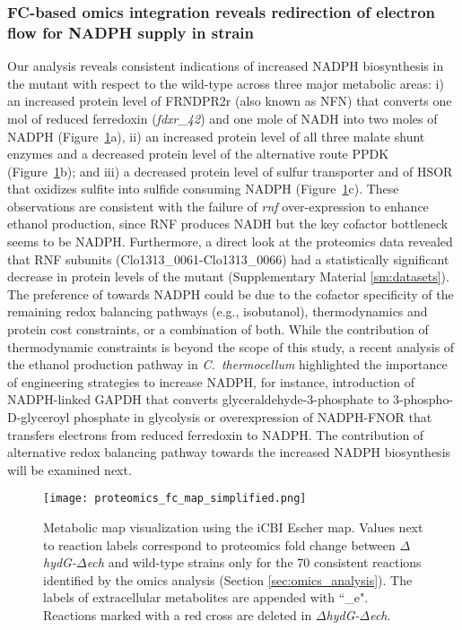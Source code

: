 \subsubsection{FC-based omics integration reveals redirection of electron flow for NADPH supply in \protect{} strain}
Our analysis reveals consistent indications of increased NADPH biosynthesis in the  mutant with respect to the wild-type across three major metabolic areas: i) an increased protein level of FRNDPR2r (also known as NFN) that converts one mol of reduced ferredoxin (\textit{fdxr\_42}) and one mole of NADH into two moles of NADPH
(Figure~\ref{fig6:map}a),
ii) an increased protein level of all three malate shunt enzymes and a decreased protein level of the alternative route PPDK (Figure~\ref{fig6:map}b);
and iii) a decreased protein level of sulfur transporter and of HSOR that oxidizes sulfite into sulfide consuming NADPH (Figure~\ref{fig6:map}c).
These observations are consistent with the failure of \textit{rnf} over-expression to enhance ethanol production,\citep{lo2017} since RNF produces NADH but the key cofactor bottleneck seems to be NADPH. Furthermore, a direct look at the proteomics data revealed that RNF subunits (Clo1313\_0061-Clo1313\_0066) had a statistically significant decrease in protein levels of the mutant (Supplementary Material \ref{sm:datasets}).
The preference of  towards NADPH could be due to the cofactor specificity of the remaining redox balancing pathways (e.g., isobutanol), thermodynamics and protein cost constraints, or a combination of both. While the contribution of thermodynamic constraints is beyond the scope of this study, a recent
analysis \citep{dash2019} of the ethanol production pathway in \textit{C.~thermocellum} highlighted the importance of engineering strategies to increase NADPH, for instance, introduction of NADPH-linked GAPDH that converts glyceraldehyde-3-phosphate to 3-phospho-D-glyceroyl phosphate in glycolysis or overexpression of NADPH-FNOR that transfers electrons from reduced ferredoxin to NADPH.
The contribution of alternative redox balancing pathway towards the increased NADPH biosynthesis will be examined next.


\begin{figure}[p]
    \centering
    \texttt{[image: proteomics\_fc\_map\_simplified.png]}
    \caption[Metabolic map visualization of proteomics data]{
        Metabolic map visualization using the iCBI Escher map. Values next to reaction labels correspond to proteomics fold change between \textit{$\Delta$hydG-$\Delta$ech} and wild-type strains only for the 70 consistent reactions identified by the omics analysis (Section \ref{sec:omics_analysis}).
    The labels of extracellular metabolites are appended with ``\_e".
    Reactions marked with a red cross are deleted in \textit{$\Delta$hydG-$\Delta$ech}.}
    \label{fig6:map}
\end{figure}


